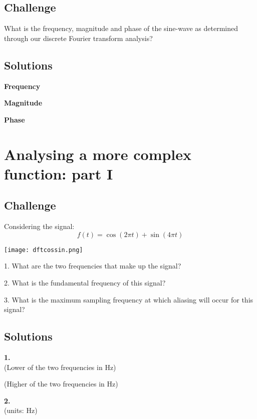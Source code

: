 \subsection*{Challenge}
What is the frequency, magnitude and phase of the sine-wave as determined through our discrete Fourier transform analysis?

\subsection*{Solutions}
\textbf{Frequency}\\

\textbf{Magnitude}\\

\textbf{Phase}




\newpage
\section{Analysing a more complex function: part I}

\subsection*{Challenge}
Considering the signal:
\begin{equation}
    f(t) = \cos(2 \pi t) + \sin(4 \pi t)
\end{equation}

\texttt{[image: dftcossin.png]}

1. What are the two frequencies that make up the signal?

2. What is the fundamental frequency of this signal?

3. What is the maximum sampling frequency at which aliasing will occur for this signal?

\subsection*{Solutions}
\textbf{1.}\\
(Lower of the two frequencies in Hz)\\

(Higher of the two frequencies in Hz)\\

\textbf{2.}\\
(units: Hz)\\

